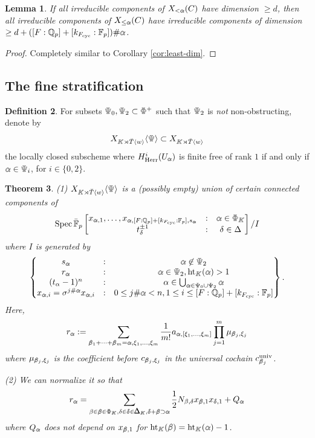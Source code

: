 \documentclass[11pt]{amsart}
\newcommand{\MINOREDITED}[1]{#1}
\newtheorem{thm}{Theorem}[section]
\newtheorem{lem}[thm]{Lemma}
\theoremstyle{definition}
\newtheorem{defn}[thm]{Definition}
\newcommand{\doublestroke}[1]{\pdfliteral{1 Tr .3 w}#1\pdfliteral{0 Tr 0 w}}
\newcommand{\BPhi}{\doublestroke{\Phi}}
\newcommand{\BPsi}{\doublestroke{\Psi}}
\newcommand{\BK}{\doublestroke{K}}
\newcommand{\Balpha}{\doublestroke{\alpha}}
\newcommand{\Bbeta}{\doublestroke{\beta}}
\newcommand{\Bdelta}{\doublestroke{\delta}}
\newcommand{\BDelta}{%
    \scalebox{.8}{$\Delta$}%
    \llap{%
            \scalebox{.9}{$\Delta$}%
    }%
}
\newcommand{\Q}{\mathbb{Q}}
\newcommand{\F}{\mathbb{F}}
\newcommand{\bFp}{\bar{\mathbb{F}}_p}
\newcommand{\bT}{\breve{T}}
\newcommand{\univ}{{\operatorname{univ}}}
\newcommand{\cyc}{{\operatorname{cyc}}}
\newcommand{\dkF}{[k_{F_{\cyc}}:\F_p]}
\newcommand{\dF}{[F:\Q_p]}
\DeclareMathOperator{\Ht}{ht}
\DeclareMathOperator{\Spec}{Spec}
\newcommand{\Herr}{\mathrm{Herr}}
\begin{document}
\begin{lem}
If all irreducible components of $X_{<\Balpha}(C)$
have dimension $\ge d$,
then
all irreducible components of
$X_{\le\Balpha}(C)$
have irreducible components of dimension
$\ge d+(\dF+\dkF)\#\Balpha$.
\label{cor:w-least-dim}
\end{lem}

\begin{proof}
Completely similar to
Corollary \ref{cor:least-dim}.
\end{proof}

\subsection{The fine stratification}

\begin{defn}
For subsets $\BPsi_0, \BPsi_2\subset \BPhi^+$
such that $\BPsi_2$ is {\it not} non-obstructing,
denote by
\[
X_{\BK\rtimes \bT\langle w\rangle}\langle\BPsi\rangle
\subset
X_{\BK\rtimes \bT\langle w\rangle}
\]
the locally closed subscheme
where
$H^i_{\Herr}(U_{\Balpha})$
is finite free of rank $1$
if and only if $\Balpha\in \BPsi_i$,
for $i\in\{0,2\}$.
\end{defn}

\begin{thm}
\rm
\label{thm:weq}
(1) 
$
X_{\BK\rtimes \bT \langle w \rangle}\langle\BPsi\rangle$
is a (possibly empty) union of certain connected components of
\[
\Spec \bFp
\left[
\begin{matrix}
x_{\Balpha,1},\dots,x_{\Balpha,\dF+\dkF,
s_{\Balpha}}&:&\Balpha\in \BPhi_{\BK}
\\
t_\delta^{\pm 1}&:&
\delta\in \Delta
\end{matrix}
\right]/
I
\]
where $I$ is generated by
\[
\left\{
\begin{matrix}
s_{\Balpha} &:& \Balpha \not\in \BPsi_2 \\
r_{\Balpha} &:& \Balpha \in \BPsi_2, \Ht_{\BK}(\Balpha)>1 \\
(t_\alpha-1)^n &:& \alpha\in \bigcup_{\Balpha\in\Psi_0\cup\Psi_2}
\Balpha\\
x_{\Balpha,i}=\sigma^{j\#\Balpha}x_{\Balpha,i}&:&
0\le j\#\Balpha<n, 1\le i\le \dF+\dkF
\end{matrix}
\right\}.
\]
Here, \[
r_{\Balpha}:=
\sum_{\Bbeta_1+\dots+\Bbeta_m=\Balpha, \xi_1,\dots,\xi_m}
\frac{1}{m!}
a_{\Balpha,[\xi_1,\dots,\xi_m]}
\prod_{j=1}^m\mu_{\Bbeta_j,\xi_j}
\]
where $\mu_{\Bbeta_j,\xi_j}$
is the coefficient before
$c_{\Bbeta_j,\xi_j}$
in the universal cochain $c_{\Bbeta_j}^\univ$.

\MINOREDITED{(2)}
We can normalize it so that
\[
r_{\Balpha}=
\sum_{\beta\in\Bbeta\in \BPhi_{\BK},
\delta\in\Bdelta\in \BDelta_{\BK}, \Bdelta+\Bbeta\supset \Balpha}
\frac{1}{2}N_{\beta, \delta}
x_{\Bbeta,1}x_{\Bdelta,1}
+Q_{\Balpha}
\]
where 
$Q_{\Balpha}$
does not depend on
$x_{\Bbeta,1}$
for $\Ht_{\BK}(\Bbeta)=\Ht_{\BK}(\Balpha)-1$.
\end{thm}
\end{document}
